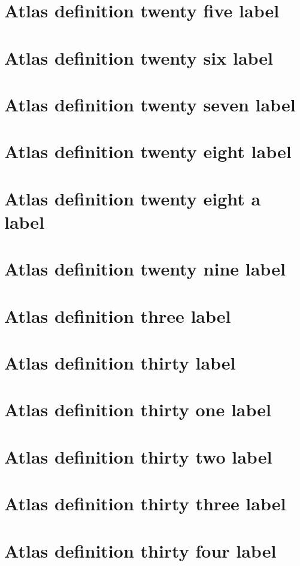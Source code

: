 \documentclass[11pt]{article}
\theoremstyle{definition}
\begin{document}
\section{Atlas definition twenty five label}
\label{ll:labels:atlas-d25}
\section{Atlas definition twenty six label}
\label{ll:labels:atlas-d26}
\section{Atlas definition twenty seven label}
\label{ll:labels:atlas-d27}
\section{Atlas definition twenty eight label}
\label{ll:labels:atlas-d28}
\section{Atlas definition twenty eight a label}
\label{ll:labels:atlas-d28a}
\section{Atlas definition twenty nine label}
\label{ll:labels:atlas-d29}
\section{Atlas definition three label}
\label{ll:labels:atlas-d3}
\section{Atlas definition thirty label}
\label{ll:labels:atlas-d30}
\section{Atlas definition thirty one label}
\label{ll:labels:atlas-d31}
\section{Atlas definition thirty two label}
\label{ll:labels:atlas-d32}
\section{Atlas definition thirty three label}
\label{ll:labels:atlas-d33}
\section{Atlas definition thirty four label}
\label{ll:labels:atlas-d34}
\end{document}
